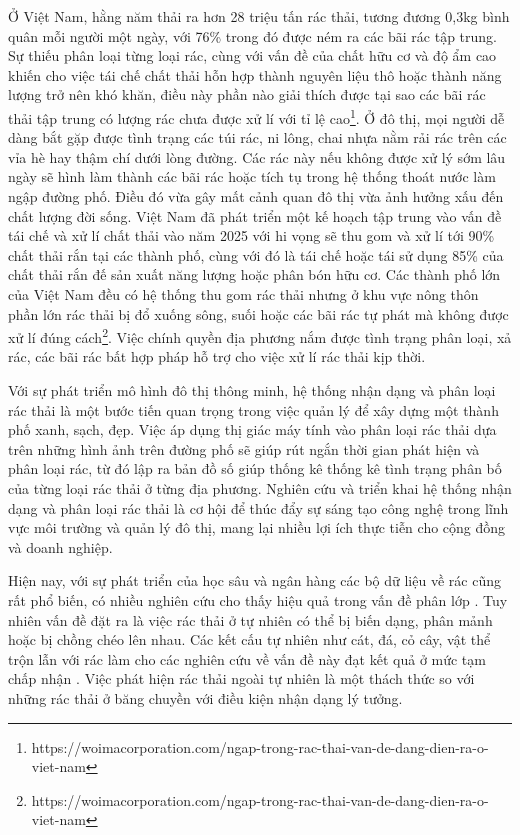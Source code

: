 \documentclass[../the.tex]{subfiles}
\begin{document}
{\fontsize{13}{12} \selectfont

Ở Việt Nam, hằng năm thải ra hơn 28 triệu tấn rác thải, tương đương 0,3kg bình quân mỗi người một ngày, với 76\% trong đó được ném ra các bãi rác tập trung. Sự thiếu phân loại từng loại rác, cùng với vấn đề của chất hữu cơ và độ ẩm cao khiến cho việc tái chế chất thải hỗn hợp thành nguyên liệu thô hoặc thành năng lượng trở nên khó khăn, điều này phần nào giải thích được tại sao các bãi rác thải tập trung có lượng rác chưa được xử lí với tỉ lệ cao\footnote[2]{https://woimacorporation.com/ngap-trong-rac-thai-van-de-dang-dien-ra-o-viet-nam}. 
Ở đô thị, mọi người dễ dàng bắt gặp được tình trạng các túi rác, ni lông, chai nhựa nằm rải rác trên các vỉa hè hay thậm chí dưới lòng đường.
Các rác này nếu không được xử lý sớm lâu ngày sẽ hình làm thành các bãi rác hoặc tích tụ trong hệ thống thoát nước làm ngập đường phố.
Điều đó vừa gây mất cảnh quan đô thị vừa ảnh hưởng xấu đến chất lượng đời sống. 
Việt Nam đã phát triển một kế hoạch tập trung vào vấn đề tái chế và xử lí chất thải vào năm 2025 với hi vọng sẽ thu gom và xử lí tới 90\% chất thải rắn tại các thành phố, cùng với đó là tái chế hoặc tái sử dụng 85\% của chất thải rắn đế sản xuất năng lượng hoặc phân bón hữu cơ.
Các thành phố lớn của Việt Nam đều có hệ thống thu gom rác thải nhưng ở khu vực nông thôn phần lớn rác thải bị đổ xuống sông, suối hoặc các bãi rác tự phát mà không được xử lí đúng cách\footnote[3]{https://woimacorporation.com/ngap-trong-rac-thai-van-de-dang-dien-ra-o-viet-nam}. 
Việc chính quyền địa phương nắm được tình trạng phân loại, xả rác, các bãi rác bất hợp pháp hỗ trợ cho việc xử lí rác thải kịp thời. 
}

\bigskip

{\fontsize{13}{12} \selectfont
Với sự phát triển mô hình đô thị thông minh, hệ thống nhận dạng và phân loại rác thải là một bước tiến quan trọng trong việc quản lý để xây dựng một thành phố xanh, sạch, đẹp.
Việc áp dụng thị giác máy tính vào phân loại rác thải dựa trên những hình ảnh trên đường phố sẽ giúp rút ngắn thời gian phát hiện và phân loại rác, từ đó lập ra bản đồ số giúp thống kê thống kê tình trạng phân bố của từng loại rác thải ở từng địa phương. Nghiên cứu và triển khai hệ thống nhận dạng và phân loại rác thải là cơ hội để thúc đẩy sự sáng tạo công nghệ trong lĩnh vực môi trường và quản lý đô thị, mang lại nhiều lợi ích thực tiễn cho cộng đồng và doanh nghiệp.
}

\bigskip

{\fontsize{13}{12} \selectfont 

Hiện nay, với sự phát triển của học sâu và ngân hàng các bộ dữ liệu về rác cũng rất phổ biến, có nhiều nghiên cứu cho thấy hiệu quả trong vấn đề phân lớp \cite{yang2016classification} \cite{shah2022method} \cite{ahmad2020intelligent}. 
Tuy nhiên vấn đề đặt ra là việc rác thải ở tự nhiên có thể bị biến dạng, phân mảnh hoặc bị chồng chéo lên nhau.
Các kết cấu tự nhiên như cát, đá, cỏ cây, vật thể trộn lẫn với rác làm cho các nghiên cứu về vấn đề này đạt kết quả ở mức tạm chấp nhận \cite{Majchrowska_2022} \cite{9122693} \cite{8793975} \cite{proença2020taco}.
Việc phát hiện rác thải ngoài tự nhiên là một thách thức so với những rác thải ở băng chuyền với điều kiện nhận dạng lý tưởng.

}
\end{document}
